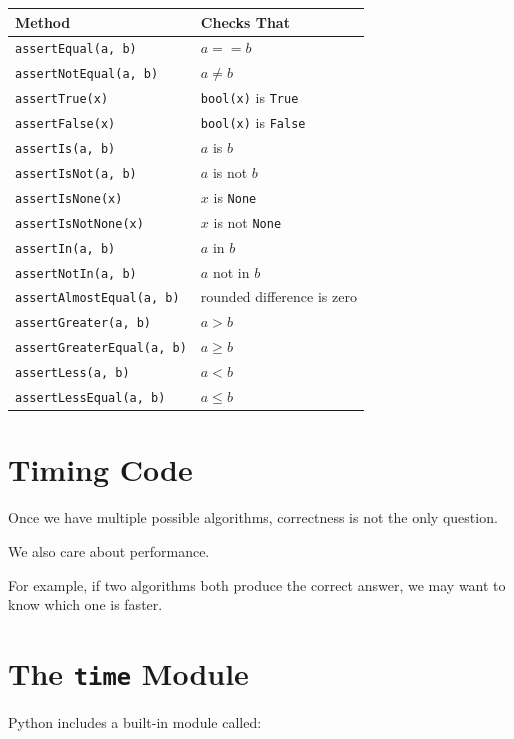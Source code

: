 \documentclass[11pt]{article}
\begin{document}
\begin{center}
\begin{tabular}{ll}
\toprule
Method & Checks That \\
\midrule
\texttt{assertEqual(a, b)} & \(a == b\) \\
\texttt{assertNotEqual(a, b)} & \(a \neq b\) \\
\texttt{assertTrue(x)} & \texttt{bool(x)} is \texttt{True} \\
\texttt{assertFalse(x)} & \texttt{bool(x)} is \texttt{False} \\
\texttt{assertIs(a, b)} & \(a\) is \(b\) \\
\texttt{assertIsNot(a, b)} & \(a\) is not \(b\) \\
\texttt{assertIsNone(x)} & \(x\) is \texttt{None} \\
\texttt{assertIsNotNone(x)} & \(x\) is not \texttt{None} \\
\texttt{assertIn(a, b)} & \(a\) in \(b\) \\
\texttt{assertNotIn(a, b)} & \(a\) not in \(b\) \\
\texttt{assertAlmostEqual(a, b)} & rounded difference is zero \\
\texttt{assertGreater(a, b)} & \(a > b\) \\
\texttt{assertGreaterEqual(a, b)} & \(a \ge b\) \\
\texttt{assertLess(a, b)} & \(a < b\) \\
\texttt{assertLessEqual(a, b)} & \(a \le b\) \\
\bottomrule
\end{tabular}
\end{center}

\section{Timing Code}

Once we have multiple possible algorithms, correctness is not the only question.

We also care about performance.

For example, if two algorithms both produce the correct answer, we may want to know which one is faster.

\section{The \texttt{time} Module}

Python includes a built-in module called:
\end{document}
